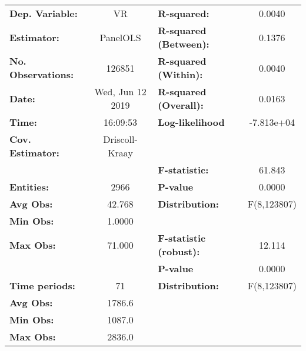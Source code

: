 \begin{center}
\begin{tabular}{lclc}
\toprule
\textbf{Dep. Variable:}                 &         VR         & \textbf{  R-squared:         }   &      0.0040      \\
\textbf{Estimator:}                     &      PanelOLS      & \textbf{  R-squared (Between):}  &      0.1376      \\
\textbf{No. Observations:}              &       126851       & \textbf{  R-squared (Within):}   &      0.0040      \\
\textbf{Date:}                          &  Wed, Jun 12 2019  & \textbf{  R-squared (Overall):}  &      0.0163      \\
\textbf{Time:}                          &      16:09:53      & \textbf{  Log-likelihood     }   &    -7.813e+04    \\
\textbf{Cov. Estimator:}                &   Driscoll-Kraay   & \textbf{                     }   &                  \\
\textbf{}                               &                    & \textbf{  F-statistic:       }   &      61.843      \\
\textbf{Entities:}                      &        2966        & \textbf{  P-value            }   &      0.0000      \\
\textbf{Avg Obs:}                       &       42.768       & \textbf{  Distribution:      }   &   F(8,123807)    \\
\textbf{Min Obs:}                       &       1.0000       & \textbf{                     }   &                  \\
\textbf{Max Obs:}                       &       71.000       & \textbf{  F-statistic (robust):} &      12.114      \\
\textbf{}                               &                    & \textbf{  P-value            }   &      0.0000      \\
\textbf{Time periods:}                  &         71         & \textbf{  Distribution:      }   &   F(8,123807)    \\
\textbf{Avg Obs:}                       &       1786.6       & \textbf{                     }   &                  \\
\textbf{Min Obs:}                       &       1087.0       & \textbf{                     }   &                  \\
\textbf{Max Obs:}                       &       2836.0       & \textbf{                     }   &                  \\

\end{tabular}
\end{center}
